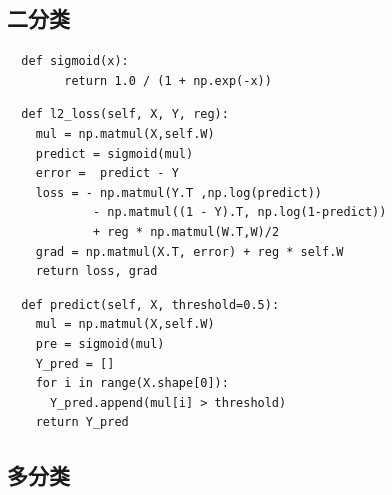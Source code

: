 \subsection{二分类}
\begin{lstlisting}
  def sigmoid(x):
        return 1.0 / (1 + np.exp(-x))
\end{lstlisting}
\begin{lstlisting}
  def l2_loss(self, X, Y, reg):
    mul = np.matmul(X,self.W)
    predict = sigmoid(mul)
    error =  predict - Y
    loss = - np.matmul(Y.T ,np.log(predict)) 
            - np.matmul((1 - Y).T, np.log(1-predict)) 
            + reg * np.matmul(W.T,W)/2 
    grad = np.matmul(X.T, error) + reg * self.W
    return loss, grad
\end{lstlisting}

\begin{lstlisting}
  def predict(self, X, threshold=0.5):
    mul = np.matmul(X,self.W)
    pre = sigmoid(mul)
    Y_pred = []
    for i in range(X.shape[0]):
      Y_pred.append(mul[i] > threshold)
    return Y_pred
\end{lstlisting}


\subsection{多分类}
















